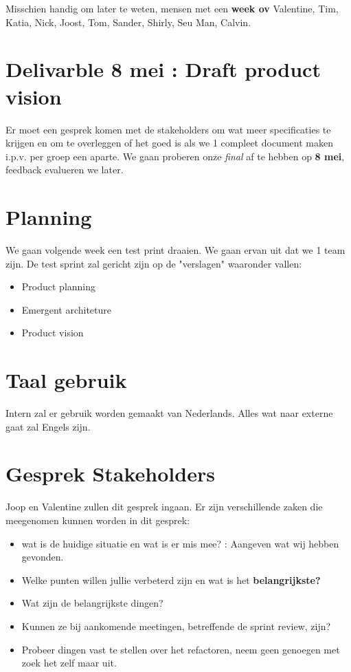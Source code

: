 \documentclass{article}
\begin{document}
Misschien handig om later te weten, mensen met een \textbf{week ov} 
Valentine, Tim, Katia, Nick, Joost, Tom, Sander, Shirly, Seu Man, Calvin.

\section{Delivarble 8 mei : Draft product vision} 
Er moet een gesprek komen met de stakeholders om wat meer specificaties te krijgen en om te overleggen of het goed is als we 1 compleet document maken i.p.v. per groep een aparte. We gaan proberen onze \emph{final} af te hebben op \textbf{8 mei}, feedback evalueren we later. 

\section{Planning} 
We gaan volgende week een test print draaien. We gaan ervan uit dat we 1 team zijn. De test sprint zal gericht zijn op de "verslagen" waaronder vallen: \begin{itemize}
\item Product planning
\item Emergent architeture
\item Product vision 
\end{itemize}

\section{Taal gebruik}
Intern zal er gebruik worden gemaakt van Nederlands. Alles wat naar externe gaat zal Engels zijn. 

\section{Gesprek Stakeholders} 
Joop en Valentine zullen dit gesprek ingaan. Er zijn verschillende zaken die meegenomen kunnen worden in dit gesprek: 
\begin{itemize}
\item wat is de huidige situatie en wat is er mis mee? : Aangeven wat wij hebben gevonden. 
\item Welke punten willen jullie verbeterd zijn en wat is het \textbf{belangrijkste?}
\item Wat zijn de belangrijkste dingen? 
\item Kunnen ze bij aankomende meetingen, betreffende de sprint review, zijn? 
\item Probeer dingen vast te stellen over het refactoren, neem geen genoegen met zoek het zelf maar uit. 
\end{itemize}
\end{document}
